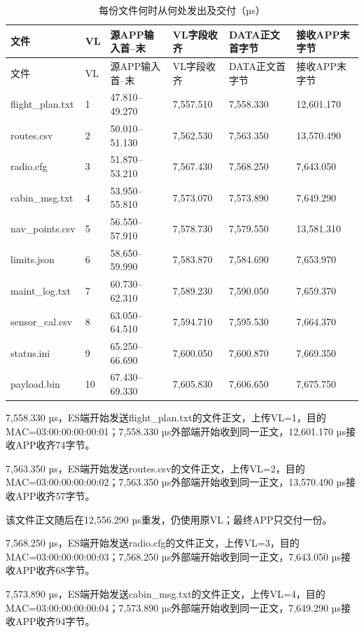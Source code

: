 \begingroup\small\setlength{\tabcolsep}{3pt}
\begin{longtable}{@{}P{29mm}P{12mm}P{28mm}P{27mm}P{27mm}P{25mm}@{}}
\caption{每份文件何时从何处发出及交付（µs）}\\\toprule
文件 & VL & 源APP输入首--末 & VL字段收齐 & DATA正文首字节 & 接收APP末字节\\
\midrule\endfirsthead\toprule
文件 & VL & 源APP输入首--末 & VL字段收齐 & DATA正文首字节 & 接收APP末字节\\
\midrule\endhead
flight\_plan.txt & 1 & 47.810--49.270 & 7,557.510 & 7,558.330 & 12,601.170\\
routes.csv & 2 & 50.010--51.130 & 7,562.530 & 7,563.350 & 13,570.490\\
radio.cfg & 3 & 51.870--53.210 & 7,567.430 & 7,568.250 & 7,643.050\\
cabin\_msg.txt & 4 & 53.950--55.810 & 7,573.070 & 7,573.890 & 7,649.290\\
nav\_points.csv & 5 & 56.550--57.910 & 7,578.730 & 7,579.550 & 13,581.310\\
limits.json & 6 & 58.650--59.990 & 7,583.870 & 7,584.690 & 7,653.970\\
maint\_log.txt & 7 & 60.730--62.310 & 7,589.230 & 7,590.050 & 7,659.370\\
sensor\_cal.csv & 8 & 63.050--64.510 & 7,594.710 & 7,595.530 & 7,664.370\\
status.ini & 9 & 65.250--66.690 & 7,600.050 & 7,600.870 & 7,669.350\\
payload.bin & 10 & 67.430--69.330 & 7,605.830 & 7,606.650 & 7,675.750\\
\bottomrule\end{longtable}\endgroup


7,558.330 µs，ES端开始发送flight\_plan.txt的文件正文，上传VL=1，目的MAC=03:00:00:00:00:01；7,558.330 µs外部端开始收到同一正文，12,601.170 µs接收APP收齐74字节。

7,563.350 µs，ES端开始发送routes.csv的文件正文，上传VL=2，目的MAC=03:00:00:00:00:02；7,563.350 µs外部端开始收到同一正文，13,570.490 µs接收APP收齐57字节。

该文件正文随后在12,556.290 µs重发，仍使用原VL；最终APP只交付一份。

7,568.250 µs，ES端开始发送radio.cfg的文件正文，上传VL=3，目的MAC=03:00:00:00:00:03；7,568.250 µs外部端开始收到同一正文，7,643.050 µs接收APP收齐68字节。

7,573.890 µs，ES端开始发送cabin\_msg.txt的文件正文，上传VL=4，目的MAC=03:00:00:00:00:04；7,573.890 µs外部端开始收到同一正文，7,649.290 µs接收APP收齐94字节。

